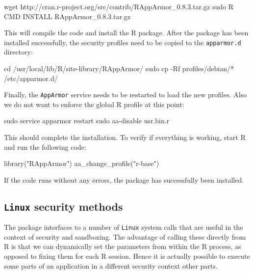 \documentclass{jss}
\newcommand{\R}{\textsf{R}\xspace}
\newcommand{\AppArmor}{\texttt{AppArmor}\xspace}
\newcommand{\RAppArmor}{\pkg{RAppArmor}\xspace}
\newcommand{\Linux}{\texttt{Linux}\xspace}
\begin{document}
\begin{CodeChunk}
\begin{CodeInput}
wget http://cran.r-project.org/src/contrib/RAppArmor_0.8.3.tar.gz
sudo R CMD INSTALL RAppArmor_0.8.3.tar.gz
\end{CodeInput}
\end{CodeChunk}

This will compile the  code and install the \R package. After the
package has been installed successfully, the security profiles need to be
copied to the \texttt{apparmor.d} directory:

\begin{CodeChunk}
\begin{CodeInput}
cd /usr/local/lib/R/site-library/RAppArmor/
sudo cp -Rf profiles/debian/* /etc/apparmor.d/
\end{CodeInput}
\end{CodeChunk}

Finally, the \AppArmor service needs to be restarted to load the new profiles.
Also we do not want to enforce the global \R profile at this point:

\begin{CodeChunk}
\begin{CodeInput}
sudo service apparmor restart
sudo aa-disable usr.bin.r
\end{CodeInput}
\end{CodeChunk}

This should complete the installation. To verify if everything is working, start
\R and run the following code:

\begin{CodeChunk}
\begin{CodeInput}
library("RAppArmor")
aa_change_profile("r-base")
\end{CodeInput}
\end{CodeChunk}

If the code runs without any errors, the package has successfully been
installed. 

\subsection[Linux security methods]{\Linux security methods}

The \RAppArmor package interfaces to a number of \Linux system calls that are
useful in the context of security and sandboxing. The advantage of calling
these directly from \R is that we can dynamically set the parameters from
within the \R process, as opposed to fixing them for each \R session. Hence it
is actually possible to execute some parts of an application in a different
security context other parts.
\end{document}
